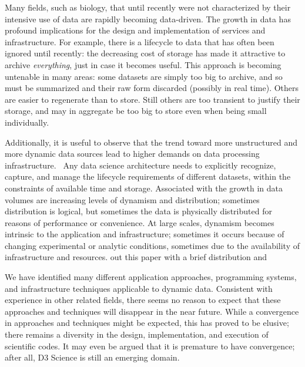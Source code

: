 \documentclass[times]{cpeauth}
\begin{document}
{Many fields, such as biology, that until recently were not characterized by
their intensive use of data are rapidly becoming data-driven.  The growth in
data has profound implications for the design and implementation of services and
infrastructure.  For example, there is a lifecycle to data that has often been
ignored until recently: the decreasing cost of storage has made it attractive to
archive \emph{everything}, just in case it becomes useful. This approach is
becoming untenable in many areas: some datasets are simply too big to archive,
and so must be summarized and their raw form discarded (possibly in real
time). Others are easier to regenerate than to store.  Still others are too
transient to justify their storage, and may in aggregate be too big to store
even when being small individually.

Additionally, it is useful to observe that the trend toward more unstructured
and more dynamic data sources lead to higher demands on data processing
infrastructure.~\cite{snia_2012} Any data science architecture needs to
explicitly recognize, capture, and manage the lifecycle requirements of
different datasets, within the constraints of available time and
storage. Associated with the growth in data volumes are increasing levels of
dynamism and distribution; sometimes distribution is logical, but sometimes the
data is physically distributed for reasons of performance or convenience. At
large scales, dynamism becomes intrinsic to the application and infrastructure;
sometimes it occurs because of changing experimental or analytic conditions,
sometimes due to the availability of infrastructure and resources.  %
out this paper with a brief %
distribution and %

We have identified many different application approaches, programming systems,
and infrastructure techniques applicable to dynamic data.  Consistent with
experience in other related fields, there seems no reason to expect that these
approaches and techniques will disappear in the near future. While a convergence
in approaches and techniques might be expected, this has proved to be elusive;
there remains a diversity in the design, implementation, and execution of
scientific codes.  It may even be argued that it is premature to have
convergence; after all, D3 Science is still an emerging domain.

}
\end{document}
